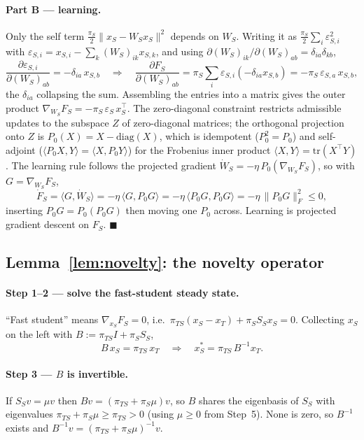 \documentclass[10pt,letterpaper]{article}
\theoremstyle{plain}
\theoremstyle{remark}
\newcommand{\eps}{\varepsilon}
\newcommand{\xT}{x_T}
\newcommand{\xS}{x_S}
\newcommand{\WS}{W_S}
\renewcommand{\SS}{S_S}
\newcommand{\FS}{F_S}
\newcommand{\epsS}{\eps_S}
\newcommand{\piS}{\pi_S}
\newcommand{\piTS}{\pi_{TS}}
\newcommand{\tr}{^{\!\top}}
\begin{document}
\paragraph{Part B --- learning.} Only the self term $\tfrac{\piS}{2}\|\xS-\WS\xS\|^2$ depends on $\WS$.
Writing it as $\tfrac{\piS}{2}\sum_i\varepsilon_{S,i}^2$ with
$\varepsilon_{S,i}=x_{S,i}-\sum_k(\WS)_{ik}x_{S,k}$, and using
$\partial(\WS)_{ik}/\partial(\WS)_{ab}=\delta_{ia}\delta_{kb}$,
\[
\frac{\partial\varepsilon_{S,i}}{\partial(\WS)_{ab}}=-\delta_{ia}\,x_{S,b}
\quad\Longrightarrow\quad
\frac{\partial\FS}{\partial(\WS)_{ab}}=\piS\sum_i\varepsilon_{S,i}(-\delta_{ia}x_{S,b})=-\piS\,\varepsilon_{S,a}\,x_{S,b},
\]
the $\delta_{ia}$ collapsing the sum. Assembling the entries into a matrix gives the outer product
$\nabla_{\WS}\FS=-\piS\,\epsS\,\xS\tr$. The zero-diagonal constraint restricts admissible updates to the
subspace $Z$ of zero-diagonal matrices; the orthogonal projection onto $Z$ is $P_0(X)=X-\mathrm{diag}(X)$,
which is idempotent ($P_0^2=P_0$) and self-adjoint ($\langle P_0X,Y\rangle=\langle X,P_0Y\rangle$) for the
Frobenius inner product $\langle X,Y\rangle=\mathrm{tr}(X\tr Y)$. The learning rule follows the projected
gradient $\dot\WS=-\eta\,P_0(\nabla_{\WS}\FS)$, so with $G=\nabla_{\WS}\FS$,
\[
\dot\FS=\langle G,\dot\WS\rangle=-\eta\,\langle G,P_0G\rangle=-\eta\,\langle P_0G,P_0G\rangle=-\eta\,\|P_0G\|_F^2\le0,
\]
inserting $P_0G=P_0(P_0G)$ then moving one $P_0$ across. Learning is projected gradient descent on $\FS$.
\hfill$\blacksquare$

\subsection{Lemma~\ref{lem:novelty}: the novelty operator}
\label{app:lem1}

\paragraph{Step 1--2 --- solve the fast-student steady state.} ``Fast student'' means
$\nabla_{\xS}\FS=0$, i.e.\ $\piTS(\xS-\xT)+\piS\SS\xS=0$. Collecting $\xS$ on the left with
$B:=\piTS I+\piS\SS$,
\[
B\,\xS=\piTS\,\xT
\quad\Longrightarrow\quad
\xS^{*}=\piTS\,B^{-1}\xT.
\]

\paragraph{Step 3 --- $B$ is invertible.} If $\SS v=\mu v$ then $Bv=(\piTS+\piS\mu)v$, so $B$ shares the
eigenbasis of $\SS$ with eigenvalues $\piTS+\piS\mu\ge\piTS>0$ (using $\mu\ge0$ from Step~5). None is
zero, so $B^{-1}$ exists and $B^{-1}v=(\piTS+\piS\mu)^{-1}v$.
\end{document}
